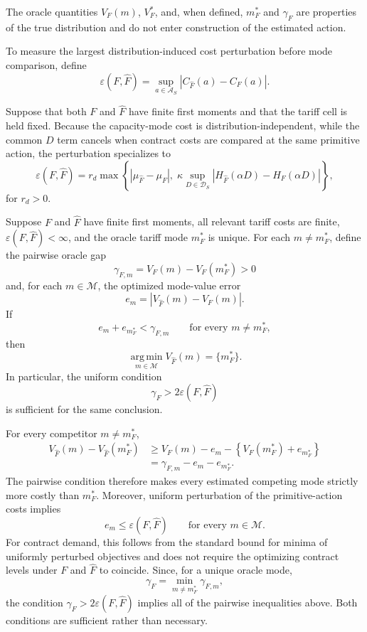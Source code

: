 \documentclass[Times1COL]{WileyNJDv5}
\begin{document}
The oracle quantities $V_F(m)$, $V_F^\ast$, and, when defined,
$m_F^\ast$ and $\gamma_F$ are properties of the true distribution and
do not enter construction of the estimated action.

To measure the largest distribution-induced cost perturbation before
mode comparison, define
\[
\varepsilon(F,\widehat F)
=
\sup_{a\in\mathcal A_S}
\left|
C_{\widehat F}(a)-C_F(a)
\right|.
\]

Suppose that both $F$ and $\widehat F$ have finite first moments and that the tariff cell is held fixed. Because the capacity-mode cost is distribution-independent, while the common $D$ term cancels when contract costs are compared at the same primitive action, the perturbation specializes to
\begin{equation}
\label{eq:epsilon}
\varepsilon(F,\widehat F)
=
r_d
\max
\left\{
\left|\mu_{\widehat F}-\mu_F\right|,
\;
\kappa
\sup_{D\in\mathcal D_S}
\left|
H_{\widehat F}(\alpha D)-H_F(\alpha D)
\right|
\right\},
\end{equation}
for $r_d>0$.

\begin{proposition}
\label{prop:mode-preservation}
Suppose $F$ and $\widehat F$ have finite first moments, all relevant
tariff costs are finite, $\varepsilon(F,\widehat F)<\infty$, and the
oracle tariff mode $m_F^\ast$ is unique. For each
$m\neq m_F^\ast$, define the pairwise oracle gap
\[
\gamma_{F,m}
=
V_F(m)-V_F(m_F^\ast)
>
0
\]
and, for each $m\in\mathcal M$, the optimized mode-value error
\[
e_m
=
\left|
V_{\widehat F}(m)-V_F(m)
\right|.
\]
If
\[
e_m+e_{m_F^\ast}
<
\gamma_{F,m}
\qquad
\text{for every }m\neq m_F^\ast,
\]
then
\[
\operatorname*{arg\,min}_{m\in\mathcal M}
V_{\widehat F}(m)
=
\{m_F^\ast\}.
\]
In particular, the uniform condition
\[
\gamma_F
>
2\varepsilon(F,\widehat F)
\]
is sufficient for the same conclusion.
\end{proposition}

\noindent
For every competitor $m\neq m_F^\ast$,
\[
\begin{aligned}
V_{\widehat F}(m)-V_{\widehat F}(m_F^\ast)
&\geq
V_F(m)-e_m
-
\left\{V_F(m_F^\ast)+e_{m_F^\ast}\right\} \\
&=
\gamma_{F,m}-e_m-e_{m_F^\ast}.
\end{aligned}
\]
The pairwise condition therefore makes every estimated competing mode
strictly more costly than $m_F^\ast$. Moreover, uniform perturbation
of the primitive-action costs implies
\[
e_m
\leq
\varepsilon(F,\widehat F)
\qquad
\text{for every }m\in\mathcal M.
\]
For contract demand, this follows from the standard bound for minima
of uniformly perturbed objectives and does not require the optimizing
contract levels under $F$ and $\widehat F$ to coincide. Since, for a
unique oracle mode,
\[
\gamma_F
=
\min_{m\neq m_F^\ast}\gamma_{F,m},
\]
the condition $\gamma_F>2\varepsilon(F,\widehat F)$ implies all of the
pairwise inequalities above. Both conditions are sufficient rather
than necessary.
\end{document}
